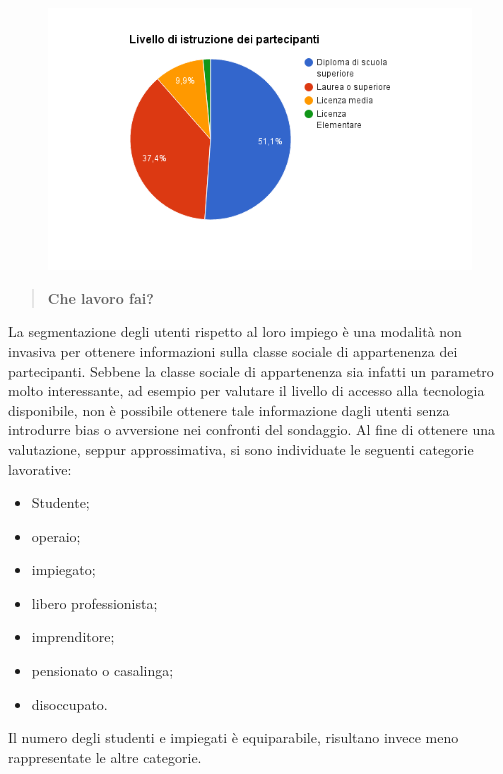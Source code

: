 \begin{figure}[H]
	\centering
	\includegraphics[scale=0.6]{img/chart_istruzione}
\end{figure}

\begin{quote}
	\textbf{Che lavoro fai?}
\end{quote}
La segmentazione degli utenti rispetto al loro impiego è una modalità non invasiva
per ottenere informazioni sulla classe sociale di appartenenza dei partecipanti.
Sebbene la classe sociale di appartenenza sia infatti un parametro molto interessante, ad esempio
per valutare il livello di accesso alla tecnologia disponibile, non è possibile ottenere
tale informazione dagli utenti senza introdurre bias o avversione nei confronti del sondaggio.
Al fine di ottenere una valutazione, seppur approssimativa, si sono individuate le seguenti categorie lavorative:

\begin{itemize}
	\item Studente;
	\item operaio;
	\item impiegato;
	\item libero professionista;
	\item imprenditore;
	\item pensionato o casalinga;
	\item disoccupato.
\end{itemize}

Il numero degli studenti e impiegati è equiparabile, risultano
invece meno rappresentate le altre categorie.

